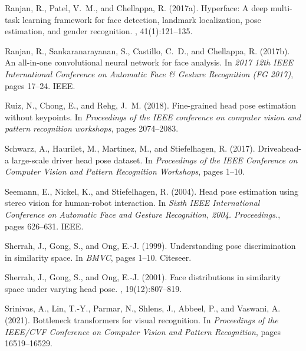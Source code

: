 \documentclass[a4paper,twoside]{article}
\begin{document}
{\begin{thebibliography}{}
Ranjan, R., Patel, V.~M., and Chellappa, R. (2017a).
\newblock Hyperface: A deep multi-task learning framework for face detection,
  landmark localization, pose estimation, and gender recognition.
,
  41(1):121--135.

Ranjan, R., Sankaranarayanan, S., Castillo, C.~D., and Chellappa, R. (2017b).
\newblock An all-in-one convolutional neural network for face analysis.
\newblock In {\em 2017 12th IEEE International Conference on Automatic Face \&
  Gesture Recognition (FG 2017)}, pages 17--24. IEEE.

Ruiz, N., Chong, E., and Rehg, J.~M. (2018).
\newblock Fine-grained head pose estimation without keypoints.
\newblock In {\em Proceedings of the IEEE conference on computer vision and
  pattern recognition workshops}, pages 2074--2083.

Schwarz, A., Haurilet, M., Martinez, M., and Stiefelhagen, R. (2017).
\newblock Driveahead-a large-scale driver head pose dataset.
\newblock In {\em Proceedings of the IEEE Conference on Computer Vision and
  Pattern Recognition Workshops}, pages 1--10.

Seemann, E., Nickel, K., and Stiefelhagen, R. (2004).
\newblock Head pose estimation using stereo vision for human-robot interaction.
\newblock In {\em Sixth IEEE International Conference on Automatic Face and
  Gesture Recognition, 2004. Proceedings.}, pages 626--631. IEEE.

Sherrah, J., Gong, S., and Ong, E.-J. (1999).
\newblock Understanding pose discrimination in similarity space.
\newblock In {\em BMVC}, pages 1--10. Citeseer.

Sherrah, J., Gong, S., and Ong, E.-J. (2001).
\newblock Face distributions in similarity space under varying head pose.
, 19(12):807--819.

Srinivas, A., Lin, T.-Y., Parmar, N., Shlens, J., Abbeel, P., and Vaswani, A.
  (2021).
\newblock Bottleneck transformers for visual recognition.
\newblock In {\em Proceedings of the IEEE/CVF Conference on Computer Vision and
  Pattern Recognition}, pages 16519--16529.


\end{thebibliography}}
\end{document}
